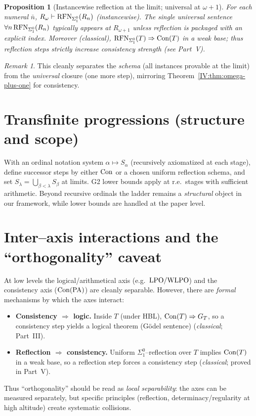 \documentclass[11pt]{article}
\newtheorem{proposition}[theorem]{Proposition}
\theoremstyle{definition}
\theoremstyle{remark}
\newtheorem{remark}[theorem]{Remark}
\newcommand{\WLPO}{\mathrm{WLPO}}
\begin{document}
\begin{proposition}[Instancewise reflection at the limit; universal at $\omega{+}1$]\label{IV:prop:reflection-limit}
For each numeral $\bar n$, $R_\omega\vdash \mathrm{RFN}_{\Sigma^0_1}(R_n)$ (instancewise). The single universal sentence
$\forall n\,\mathrm{RFN}_{\Sigma^0_1}(R_n)$ typically appears at $R_{\omega+1}$ unless reflection is packaged with an explicit index.
Moreover (\emph{classical}), $\mathrm{RFN}_{\Sigma^0_1}(T)\Rightarrow \mathrm{Con}(T)$ in a weak base; thus reflection steps strictly increase consistency strength (see Part~V).
\end{proposition}

\begin{remark}
This cleanly separates the \emph{schema} (all instances provable at the limit) from the \emph{universal} closure (one more step), mirroring Theorem~\ref{IV:thm:omega-plus-one} for consistency.
\end{remark}

\section{Transfinite progressions (structure and scope)}

With an ordinal notation system $\alpha\mapsto S_\alpha$ (recursively axiomatized at each stage),
define successor steps by either $\mathrm{Con}$ or a chosen uniform reflection schema, and set
$S_\lambda=\bigcup_{\beta<\lambda}S_\beta$ at limits. G2 lower bounds apply at r.e.\ stages with sufficient arithmetic.
Beyond recursive ordinals the ladder remains a \emph{structural} object in our framework, while lower bounds are handled at the paper level.

\section{Inter–axis interactions and the ``orthogonality'' caveat}

At low levels the logical/arithmetical axis (e.g.\ \(\LPO/\WLPO\)) and the consistency axis
(\(\mathrm{Con}(\mathrm{PA})\)) are cleanly separable. However, there are \emph{formal} mechanisms by which the axes interact:
\begin{itemize}
\item \textbf{Consistency $\Rightarrow$ logic.} Inside $T$ (under HBL), $\mathrm{Con}(T)\Rightarrow G_T$,
so a consistency step yields a logical theorem (G\"odel sentence) (\emph{classical}; Part~III).
\item \textbf{Reflection $\Rightarrow$ consistency.} Uniform $\Sigma^0_1$--reflection over $T$
implies $\mathrm{Con}(T)$ in a weak base, so a reflection step forces a consistency step (\emph{classical}; proved in Part~V).
\end{itemize}
Thus ``orthogonality'' should be read as \emph{local separability}: the axes can be measured separately,
but specific principles (reflection, determinacy/regularity at high altitude) create systematic collisions.
\end{document}
